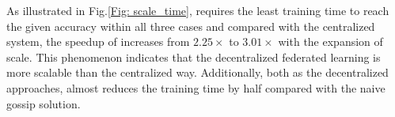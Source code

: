 As illustrated in Fig.\ref{Fig: scale_time}, \sys requires the least training time to reach the given accuracy within all three cases and compared with the centralized system, the speedup of \sys increases from $2.25\times$ to $3.01\times$ with the expansion of scale. This phenomenon indicates that the decentralized federated learning is more scalable than the centralized way. Additionally, both as the decentralized approaches, \sys almost reduces the training time by half compared with the naive gossip solution.

\begin{figure}[htbp]

\begin{minipage}[t]{0.32\textwidth}%
{}
\\


\end{minipage}
\end{figure}
